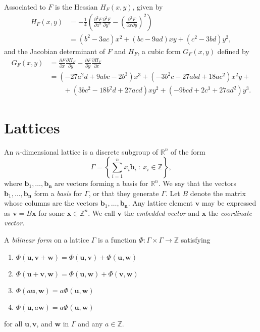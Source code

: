 \documentclass[11pt]{report}
\theoremstyle{definition}
\begin{document}
Associated to $F$ is the Hessian $H_F(x,y)$, given by
\begin{align*}
H_F(x,y) & = -\frac{1}{4}\left( \frac{\partial^2F}{\partial x^2} \frac{\partial^2F}{\partial y^2} - \left(\frac{\partial^2F}{\partial x \partial y}\right)^2\right)\\
& = (b^2 - 3ac)x^2 + (bc - 9ad)xy + (c^2 - 3bd)y^2,
\end{align*}
and the Jacobian determinant of $F$ and $H_F$, a cubic form $G_F(x,y)$ defined by
\begin{align*}
G_F(x,y) &= \frac{\partial F}{\partial x} \frac{\partial H_F}{\partial y} - \frac{\partial F}{\partial y} \frac{\partial H_F}{\partial x} \\
& =  (-27a^2d + 9abc -2b^3)x^3 + (-3b^2c - 27abd + 18ac^2)x^2y +  \\
& \quad \quad + (3bc^2 - 18b^2d + 27acd)xy^2 + (-9bcd + 2c^3 + 27ad^2)y^3.
\end{align*}


\section{Lattices}
\label{sec:Lattices}

An $n$-dimensional lattice is a discrete subgroup of $\mathbb{R}^n$ of the form
\[\Gamma = \left\{ \sum_{i=1}^n x_i \mathbf{b}_i \ : \ x_i \in \mathbb{Z} \right\},\]
where $\mathbf{b}_1, \dots, \mathbf{b_n}$ are vectors forming a basis for $\mathbb{R}^n$. We say that the vectors $\mathbf{b}_1, \dots, \mathbf{b_n}$ form a \textit{basis} for $\Gamma$, or that they generate $\Gamma$. Let $B$ denote the matrix whose columns are the vectors $\mathbf{b}_1, \dots, \mathbf{b_n}$. Any lattice element $\mathbf{v}$ may be expressed as $\mathbf{v} = B\mathbf{x}$ for some $\mathbf{x} \in \mathbb{Z}^n$. We call $\mathbf{v}$ the \textit{embedded vector} and $\mathbf{x}$ the \textit{coordinate vector}.

A \textit{bilinear form} on a lattice $\Gamma$ is a function $\Phi: \Gamma \times \Gamma \to \mathbb{Z}$ satisfying
\begin{enumerate}
\item $\Phi(\mathbf{u}, \mathbf{v}+\mathbf{w}) = \Phi(\mathbf{u},\mathbf{v}) + \Phi(\mathbf{u},\mathbf{w})$
\item $\Phi(\mathbf{u}+\mathbf{v}, \mathbf{w}) = \Phi(\mathbf{u},\mathbf{w}) + \Phi(\mathbf{v},\mathbf{w})$
\item $\Phi(a\mathbf{u}, \mathbf{w}) = a\Phi(\mathbf{u},\mathbf{w})$
\item $\Phi(\mathbf{u}, a\mathbf{w}) = a\Phi(\mathbf{u},\mathbf{w})$
\end{enumerate}
for all $\mathbf{u}, \mathbf{v}$, and $\mathbf{w}$ in $\Gamma$ and any $a \in \mathbb{Z}$.
\end{document}
